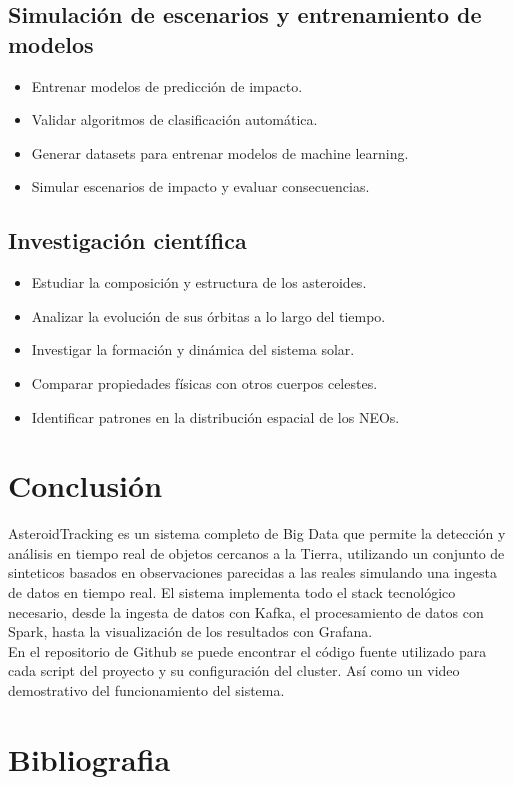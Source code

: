 \documentclass[12pt]{article}
\begin{document}
\subsection{Simulación de escenarios y entrenamiento de modelos}
\begin{itemize}
  \item Entrenar modelos de predicción de impacto.
  \item Validar algoritmos de clasificación automática.
  \item Generar datasets para entrenar modelos de machine learning.
  \item Simular escenarios de impacto y evaluar consecuencias.
\end{itemize}
\subsection{Investigación científica}
\begin{itemize}
  \item Estudiar la composición y estructura de los asteroides.
  \item Analizar la evolución de sus órbitas a lo largo del tiempo.
  \item Investigar la formación y dinámica del sistema solar.
  \item Comparar propiedades físicas con otros cuerpos celestes.
  \item Identificar patrones en la distribución espacial de los NEOs.
\end{itemize}

\clearpage

\section{Conclusión}

AsteroidTracking es un sistema completo de Big Data que permite la detección y análisis en tiempo real de objetos cercanos a la Tierra,
utilizando un conjunto de sinteticos basados en observaciones parecidas a las reales simulando una ingesta de datos en tiempo real.
El sistema implementa todo el stack tecnológico necesario, desde la ingesta de datos con Kafka, el procesamiento de datos con Spark,
hasta la visualización de los resultados con Grafana.
\\
En el repositorio de Github se puede encontrar el código fuente utilizado para cada script del proyecto y su configuración del cluster. Así como
un video demostrativo del funcionamiento del sistema.

\clearpage

\section{Bibliografia}

\cite{neows-api}
\cite{Sentry-System}
\cite{joke2k-faker}
\cite{numpy}
\cite{spark}
\cite{kafka}
\cite{prometheus}
\cite{grafana}
\cite{Standard-asteroids-physical-characteristics}
\cite{Movimiento-Orbital}
\cite{Impact-probability}


\printbibliography
\end{document}
